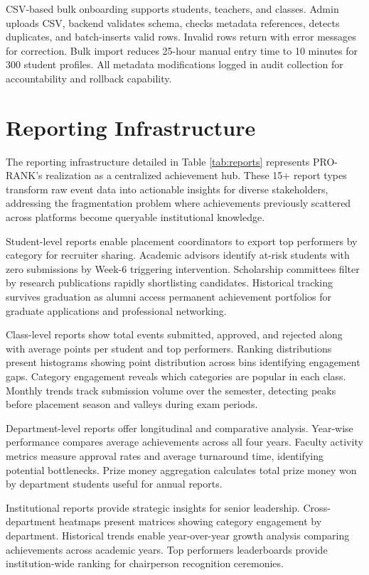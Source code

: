 \documentclass[conference]{IEEEtran}
\begin{document}
CSV-based bulk onboarding supports students, teachers, and classes. Admin uploads CSV, backend validates schema, checks metadata references, detects duplicates, and batch-inserts valid rows. Invalid rows return with error messages for correction. Bulk import reduces 25-hour manual entry time to 10 minutes for 300 student profiles. All metadata modifications logged in audit collection for accountability and rollback capability.

\section{Reporting Infrastructure}

The reporting infrastructure detailed in Table \ref{tab:reports} represents PRO-RANK's realization as a centralized achievement hub. These 15+ report types transform raw event data into actionable insights for diverse stakeholders, addressing the fragmentation problem where achievements previously scattered across platforms become queryable institutional knowledge.

Student-level reports enable placement coordinators to export top performers by category for recruiter sharing. Academic advisors identify at-risk students with zero submissions by Week-6 triggering intervention. Scholarship committees filter by research publications rapidly shortlisting candidates. Historical tracking survives graduation as alumni access permanent achievement portfolios for graduate applications and professional networking.

Class-level reports show total events submitted, approved, and rejected along with average points per student and top performers. Ranking distributions present histograms showing point distribution across bins identifying engagement gaps. Category engagement reveals which categories are popular in each class. Monthly trends track submission volume over the semester, detecting peaks before placement season and valleys during exam periods.

Department-level reports offer longitudinal and comparative analysis. Year-wise performance compares average achievements across all four years. Faculty activity metrics measure approval rates and average turnaround time, identifying potential bottlenecks. Prize money aggregation calculates total prize money won by department students useful for annual reports.

Institutional reports provide strategic insights for senior leadership. Cross-department heatmaps present matrices showing category engagement by department. Historical trends enable year-over-year growth analysis comparing achievements across academic years. Top performers leaderboards provide institution-wide ranking for chairperson recognition ceremonies.
\end{document}
